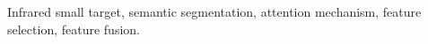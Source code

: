 
\begin{abstract}
The code is available at \url{https:}.
\end{abstract}

\begin{IEEEkeywords}
Infrared small target, semantic segmentation, attention mechanism, feature selection, feature fusion.
\end{IEEEkeywords}
\vspace{-1\baselineskip}
